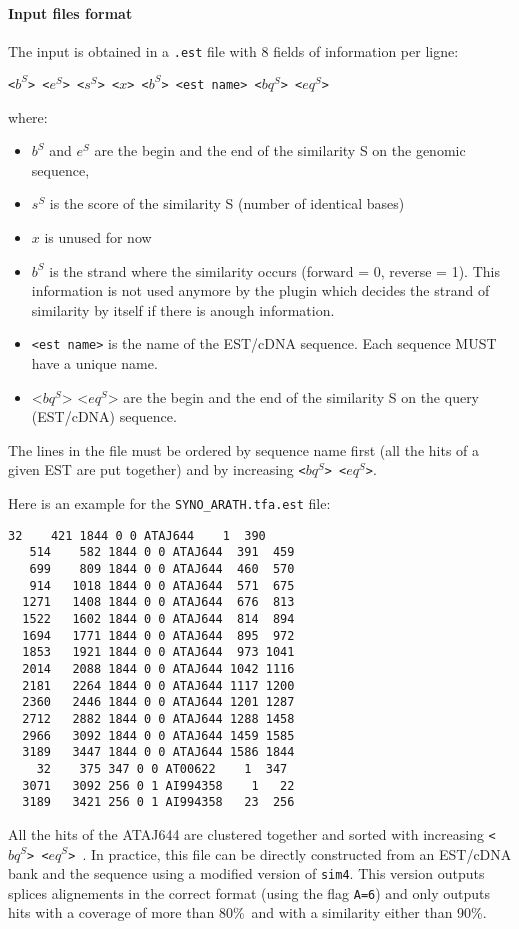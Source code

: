 \paragraph{Input files format}

The input is obtained in a \texttt{.est} file with 8 fields of information
per ligne:

\texttt{<$b^S$> <$e^S$> <$s^S$> <$x$> <$b^S$> <est name> <$bq^S$> <$eq^S$>}

where:
\begin{itemize}
\item $b^S$ and $e^S$ are the begin and the end of the similarity S on the genomic sequence,
\item $s^S$ is the score of the similarity S (number of identical bases)
\item $x$ is unused for now
\item $b^S$ is the strand where the similarity occurs (forward = 0,
  reverse = 1). This information is not used anymore by the plugin
  which decides the strand of similarity by itself if there is anough
  information.
\item \texttt{<est name>} is the name of the EST/cDNA sequence. Each
  sequence MUST have a unique name.
\item <$bq^S$> <$eq^S$> are the begin and the end of the similarity S
  on the query (EST/cDNA) sequence.
\end{itemize}
The lines in the file must be ordered by sequence name first (all the
hits of a given EST are put together) and by increasing
\texttt{<$bq^S$> <$eq^S$>}. 

Here is an example for the \texttt{SYNO\_ARATH.tfa.est} file:
\begin{Verbatim}[fontsize=\small]
    32    421 1844 0 0 ATAJ644    1  390
   514    582 1844 0 0 ATAJ644  391  459
   699    809 1844 0 0 ATAJ644  460  570
   914   1018 1844 0 0 ATAJ644  571  675
  1271   1408 1844 0 0 ATAJ644  676  813
  1522   1602 1844 0 0 ATAJ644  814  894
  1694   1771 1844 0 0 ATAJ644  895  972
  1853   1921 1844 0 0 ATAJ644  973 1041
  2014   2088 1844 0 0 ATAJ644 1042 1116
  2181   2264 1844 0 0 ATAJ644 1117 1200
  2360   2446 1844 0 0 ATAJ644 1201 1287
  2712   2882 1844 0 0 ATAJ644 1288 1458
  2966   3092 1844 0 0 ATAJ644 1459 1585
  3189   3447 1844 0 0 ATAJ644 1586 1844
    32    375 347 0 0 AT00622    1  347
  3071   3092 256 0 1 AI994358    1   22
  3189   3421 256 0 1 AI994358   23  256
\end{Verbatim}

All the hits of the ATAJ644 are clustered together and sorted with
increasing \texttt{<$bq^S$> <$eq^S$> }. In practice, this file can be
directly constructed from an EST/cDNA bank and the sequence using a
modified version of \texttt{sim4}. This version outputs splices
alignements in the correct format (using the flag \texttt{A=6}) and
only outputs hits with a coverage of more than 80\%\ and with a
similarity either than 90\%.

